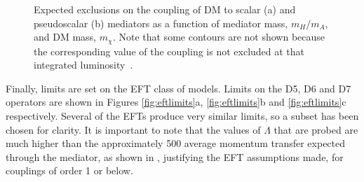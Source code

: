 \begin{figure}

  \caption{Expected exclusions on the coupling of DM to scalar (a) and pseudoscalar (b) mediators as a function of mediator mass, $m_{H}/m_{A}$, and DM mass, $m_{\chi}$. Note that some contours are not shown because the corresponding value of the coupling is not excluded at that integrated luminosity~\cite{ourdmpaper}.}
  \label{fig:simplifiedmodellimits}
\end{figure}

Finally, limits are set on the \ac{EFT} class of models. Limits on the D5, D6 and D7 operators are shown in Figures \ref{fig:eftlimits}a, \ref{fig:eftlimits}b and \ref{fig:eftlimits}c respectively. Several of the \ac{EFT}s produce very similar limits, so a subset has been chosen for clarity. It is important to note that the values of $\Lambda$ that are probed are much higher than the approximately 500 \GeV average momentum transfer expected through the mediator, as shown in , justifying the \ac{EFT} assumptions made, for couplings of order 1 or below.


